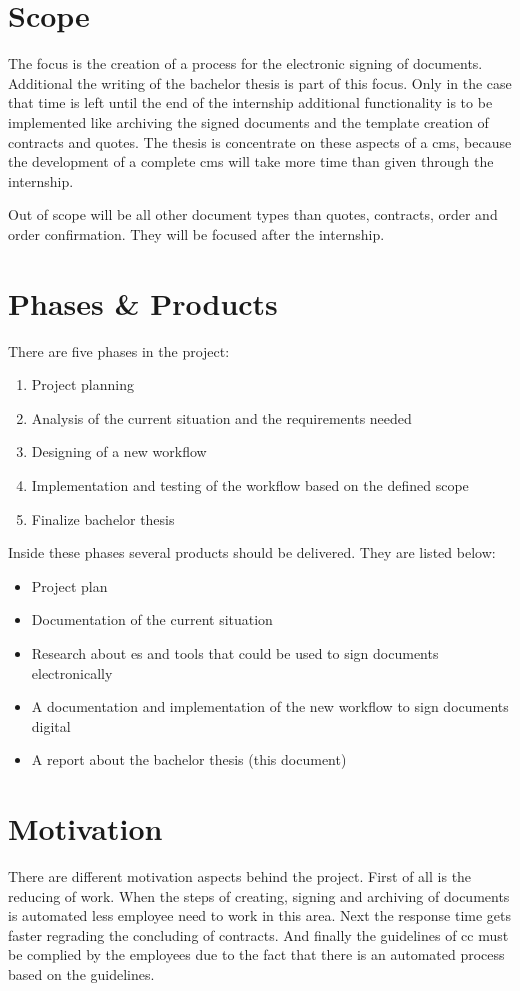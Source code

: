  \section{Scope}
 The focus is the creation of a process for the electronic signing of documents. Additional the writing of the bachelor thesis is part of this focus. Only in the case that time is left until the end of the internship additional functionality is to be implemented like archiving the signed documents and the template creation of contracts and quotes. The thesis is concentrate on these aspects of a \gls{cms}, because the development of a complete \gls{cms} will take more time than given through the internship. 
 
 Out of scope will be all other document types than quotes, contracts, order and order confirmation. They will be focused after the internship.
 
 \section{Phases \& Products} \label{sec:phases}
 There are five phases in the project:
 \begin{enumerate}
 	\item Project planning
 	\item Analysis of the current situation and the requirements needed
 	\item Designing of a new workflow
 	\item Implementation and testing of the workflow based on the defined scope
 	\item Finalize bachelor thesis
 \end{enumerate}
 
 Inside these phases several products should be delivered. They are listed below:
 \begin{itemize}
 	\item Project plan
 	\item Documentation of the current situation
 	\item Research about \gls{es} and tools that could be used to sign documents electronically
 	\item A documentation and implementation of the new workflow to sign documents digital
 	\item A report about the bachelor thesis (this document)
 \end{itemize}
 
 \section{Motivation}
 There are different motivation aspects behind the project. First of all is the reducing of work. When the steps of creating, signing and archiving of documents is automated less employee need to work in this area. Next the response time gets faster regrading the concluding of contracts. And finally the guidelines of \gls{cc} must be complied by the employees due to the fact that there is an automated process based on the guidelines. 